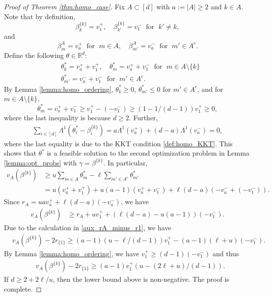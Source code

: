 \documentclass[aap,preprint]{imsart}
\newcommand{\bR}{{\mathbb{R}}}
\theoremstyle{plain}
\theoremstyle{definition}
\begin{document}
\begin{appendix}
\begin{proof}[Proof of Theorem \ref{thm:homo_case}]
Fix $A \subset [d]$ with $a  :=  |A| \geq 2$ and $k \in A$. Note that by definition,
$$
\beta^{\{k\}}_{k} = v_1^{+},\quad
\beta^{\{k\}}_{k'} = v_1^{-}\; \text{ for } \;k' \neq k,
$$
and
$$
\beta^{A}_{m} = v_a^{+}\; \text{ for } \;m \in A,\quad
\beta^{A}_{m'} = v_a^{-}\; \text{ for } \;m' \in A^c.
$$
Define the following $\theta \in \bR^d$:
\begin{align*}
    &\theta_{k}^{*} = v_a^{+} + v_1^{+}, \quad
    \theta_{m}^{*} = v_a^{+} + v_1^{-}\; \text{ for } \;m \in A \setminus \{k\}\\
    &\theta_{m'}^{*} = v_a^{-} + v_1^{-}\; \text{ for } \;m' \in A^c.
\end{align*}
By Lemma \ref{lemma:homo_ordering}, $\theta_k^{*} \geq 0$, $\theta_{m'}^{*} \leq 0$ for $m' \in A^c$, and for $m \in A \setminus \{k\}$,
$$
\theta_{m}^{*} = v_a^{+} + v_1^{-} \geq v_1^{+} - (-v_1^{-}) \geq (1-1/(d-1)) v_1^{+} \geq 0,
$$
where the last inequality is because $d \geq 2$. Further,
\begin{align*}
    \sum_{i \in [d]} \Lambda^{1}(\theta_i^{*} - \beta^{\{k\}}_i) = a \Lambda^{1}(v_a^{+}) + (d-a) \Lambda^{1}(v_a^{-}) = 0,
\end{align*}
where the last equality is due to the KKT condition \eqref{def:homo_KKT}. This shows that $\theta^{*}$ is a feasible solution to the second optimization problem in Lemma \ref{lemma:opt_probs} with $\gamma = \beta^{\{k\}}$. In particular,
\begin{align*}
 v_A(\beta^{\{k\}}) 
 &\geq u \sum_{m \in A} \theta^{*}_m - \ell \sum_{m' \in A^c} \theta^{*}_{m'} \\
 & = u(v_a^{+} + v_1^{+}) + u (a-1) (v_a^+ + v_1^{-}) +\ell (d-a)(-v_a^{-} + (-v_1^{-})).
\end{align*}
Since $r_A = u a v_a^{+} + \ell (d-a)(-v_a^{-})$, we have
\begin{align*}
 v_A(\beta^{\{k\}}) 
 &\geq r_A + u v_1^{+}   + (\ell(d-a)-u(a-1))(-v_1^{-}).
\end{align*}
Due to the calculation in \eqref{aux_rA_minus_r1}, we have
\begin{align*}
   &v_A(\beta^{\{k\}}) 
  - 2r_{\{1\}} 
     \geq (a-1)(u-\ell/(d-1)) v_1^{+} - (a-1)(\ell+u)(-v_1^{-}).
\end{align*}
By Lemma \ref{lemma:homo_ordering}, we have $v_1^{+} \geq (d-1)(-v_1^{-})$ and thus
\begin{align*}
     &
     v_A(\beta^{\{k\}}) - 2r_{\{1\}} 
     \geq (a-1) v_1^{+} (u - (2\ell+u)/(d-1)).
\end{align*}
If $d \geq 2+2\ell/u$, then the lower bound above is non-negative. The proof is complete.
\end{proof}





\end{appendix}
\end{document}
